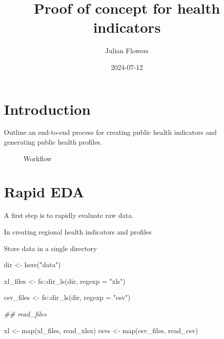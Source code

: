 \documentclass[
  letterpaper,
  DIV=11,
  numbers=noendperiod]{scrreprt}
\title{Proof of concept for health indicators}
\author{Julian Flowers}
\date{2024-07-12}
\newenvironment{Shaded}{\begin{snugshade}}{\end{snugshade}}
\newcommand{\AttributeTok}[1]{\textcolor[rgb]{0.40,0.45,0.13}{#1}}
\newcommand{\DocumentationTok}[1]{\textcolor[rgb]{0.37,0.37,0.37}{\textit{#1}}}
\newcommand{\FunctionTok}[1]{\textcolor[rgb]{0.28,0.35,0.67}{#1}}
\newcommand{\NormalTok}[1]{\textcolor[rgb]{0.00,0.23,0.31}{#1}}
\newcommand{\OtherTok}[1]{\textcolor[rgb]{0.00,0.23,0.31}{#1}}
\newcommand{\SpecialCharTok}[1]{\textcolor[rgb]{0.37,0.37,0.37}{#1}}
\newcommand{\StringTok}[1]{\textcolor[rgb]{0.13,0.47,0.30}{#1}}
\renewcommand*\contentsname{Table of contents}
\newcommand\contentsname{Table of contents}
\begin{document}
\maketitle

\renewcommand*\contentsname{Table of contents}
{
\hypersetup{linkcolor=}
\setcounter{tocdepth}{2}
\tableofcontents
}

\chapter{Introduction}\label{introduction}

Outline an end-to-end process for creating public health indicators and
generating public health profiles.

\begin{figure}


\caption{\label{fig-comp}Workflow}

\end{figure}%


\chapter{Rapid EDA}\label{rapid-eda}

A first step is to rapidly evaluate raw data.

In creating regional health indicators and profiles

Store data in a single directory

\begin{Shaded}
\begin{Highlighting}[]
\NormalTok{dir }\OtherTok{\textless{}{-}} \FunctionTok{here}\NormalTok{(}\StringTok{"data"}\NormalTok{)}

\NormalTok{xl\_files }\OtherTok{\textless{}{-}}\NormalTok{ fs}\SpecialCharTok{::}\FunctionTok{dir\_ls}\NormalTok{(dir, }\AttributeTok{regexp =} \StringTok{"xls"}\NormalTok{)}

\NormalTok{csv\_files }\OtherTok{\textless{}{-}}\NormalTok{ fs}\SpecialCharTok{::}\FunctionTok{dir\_ls}\NormalTok{(dir, }\AttributeTok{regexp =} \StringTok{"csv"}\NormalTok{)}

\DocumentationTok{\#\# read\_files }

\NormalTok{xl }\OtherTok{\textless{}{-}} \FunctionTok{map}\NormalTok{(xl\_files, read\_xlsx)}
\NormalTok{csvs }\OtherTok{\textless{}{-}} \FunctionTok{map}\NormalTok{(csv\_files, read\_csv)}
\end{Highlighting}
\end{Shaded}
\end{document}
